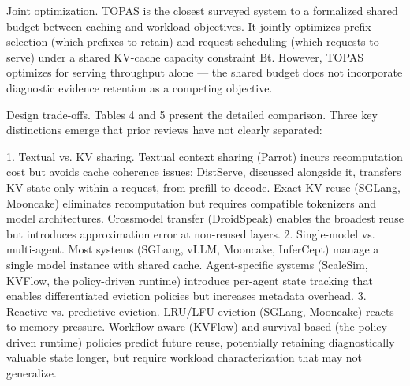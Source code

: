 \documentclass[preprint,12pt]{elsarticle}
\begin{document}
Joint optimization. TOPAS \cite{v5ref24} is the closest surveyed system to a formalized shared budget between caching and workload objectives. It jointly optimizes prefix selection (which prefixes to retain) and request scheduling (which requests to serve) under a shared KV-cache capacity constraint Bt. However, TOPAS optimizes for serving throughput alone --- the shared budget does not incorporate diagnostic evidence retention as a competing objective.


Design trade-offs. Tables 4 and 5 present the detailed comparison. Three key distinctions emerge that prior reviews have not clearly separated:


1. Textual vs. KV sharing. Textual context sharing (Parrot) incurs recomputation cost but avoids cache coherence issues; DistServe, discussed alongside it, transfers KV state only within a request, from prefill to decode. Exact KV reuse (SGLang, Mooncake) eliminates recomputation but requires compatible tokenizers and model architectures. Crossmodel transfer (DroidSpeak) enables the broadest reuse but introduces approximation error at non-reused layers. 2. Single-model vs. multi-agent. Most systems (SGLang, vLLM, Mooncake, InferCept) manage a single model instance with shared cache. Agent-specific systems (ScaleSim, KVFlow, the policy-driven runtime) introduce per-agent state tracking that enables differentiated eviction policies but increases metadata overhead. 3. Reactive vs. predictive eviction. LRU/LFU eviction (SGLang, Mooncake) reacts to memory pressure. Workflow-aware (KVFlow) and survival-based (the policy-driven runtime) policies predict future reuse, potentially retaining diagnostically valuable state longer, but require workload characterization that may not generalize.
\end{document}
